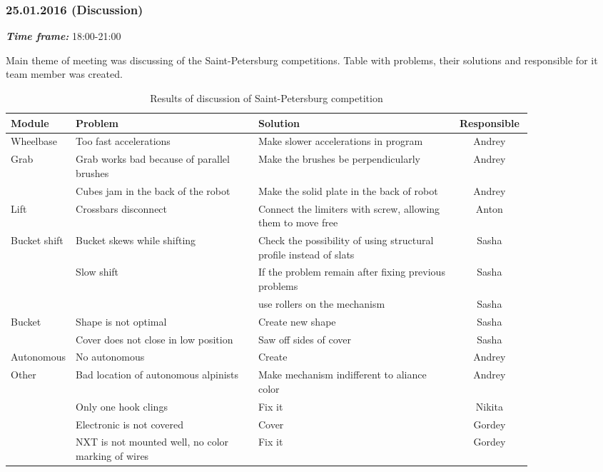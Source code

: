 \subsubsection{25.01.2016 (Discussion)}
\textit{\textbf{Time frame:}} 18:00-21:00 \newline

Main theme of meeting was discussing of the Saint-Petersburg competitions. Table with problems, their solutions and responsible for it team member was created.

\begin{table}[h!]
  \caption{Results of discussion of Saint-Petersburg competition}
  \centering
    \begin{tabular}{p{0.12\linewidth}|p{0.35\linewidth}|p{0.38\linewidth}|c}
		Module & Problem & Solution & Responsible \\
		\hline
		Wheelbase & Too fast accelerations & Make slower accelerations in program & \multicolumn{1}{c}{Andrey} \\
		\hline
		Grab  & Grab works bad because of parallel brushes & Make the brushes be perpendicularly & \multicolumn{1}{c}{Andrey} \\
		& Cubes jam in the back of the robot & Make the solid plate in the back of robot & \multicolumn{1}{c}{Andrey} \\
		\hline
		Lift  & Crossbars disconnect & Connect the limiters with screw, allowing them to move free & \multicolumn{1}{c}{Anton} \\
		\hline
		Bucket shift & Bucket skews while shifting & Check the possibility of using structural profile instead of slats & \multicolumn{1}{c}{Sasha} \\
		& Slow shift & If the problem remain after fixing previous problems & \multicolumn{1}{c}{Sasha} \\
		&       & use rollers on the mechanism & \multicolumn{1}{c}{Sasha} \\
		\hline
		Bucket & Shape is not optimal & Create new shape & \multicolumn{1}{c}{Sasha} \\
		& Cover does not close in low position & Saw off sides of cover & \multicolumn{1}{c}{Sasha} \\
		\hline
		Autonomous & No autonomous & Create & \multicolumn{1}{c}{Andrey} \\
		\hline
		Other & Bad location of autonomous alpinists & Make mechanism indifferent to aliance color & \multicolumn{1}{c}{Andrey} \\
		& Only one hook clings & Fix it & \multicolumn{1}{c}{Nikita} \\
		& Electronic is not covered & Cover & \multicolumn{1}{c}{Gordey} \\
		& NXT is not mounted well, no color marking of wires & Fix it & \multicolumn{1}{c}{Gordey} \\
    \end{tabular}%
  \label{tabular:meetingSPB25.01}%
\end{table}%